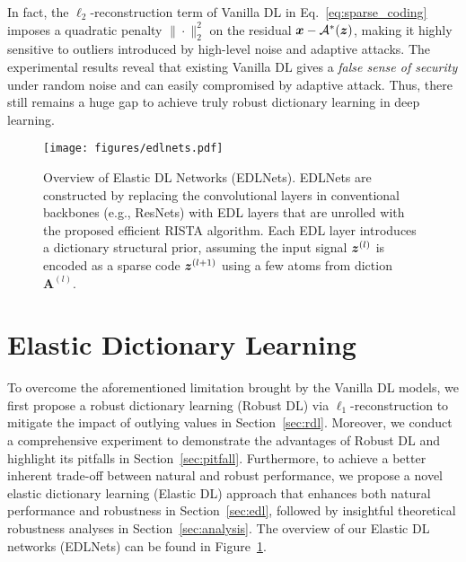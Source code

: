  
 
 

 In fact, the $\ell_2$-reconstruction term of Vanilla DL in Eq.~\eqref{eq:sparse_coding} imposes a quadratic penalty $\|\cdot\|_2^2$ on the residual ${\bm{x}}-{\mathcal{A}}^*({\bm{z}})$, making it highly sensitive to outliers introduced by high-level noise and adaptive attacks.
 The experimental results reveal that existing Vanilla DL gives a \textit{false sense of security} under random noise and can easily compromised by adaptive attack. Thus, there still remains a huge gap to achieve truly robust dictionary learning in deep learning.




\begin{figure*}[h!]
    \centering
    \texttt{[image: figures/edlnets.pdf]} 
    \caption{Overview of Elastic DL Networks (EDLNets). EDLNets are constructed by replacing the convolutional layers in conventional backbones 
    (e.g., ResNets)
    with EDL layers that are unrolled with the proposed efficient RISTA algorithm. Each EDL layer introduces a 
    dictionary structural prior, 
    assuming the input signal ${\bm{z}}^{(l)}$ is encoded as a sparse code ${\bm{z}}^{(l+1)}$ using a few atoms from diction $\mathbf{A}^{(l)}$.
  }
    \label{fig:overview_edlnets}
    \vspace{-0.1in}
\end{figure*}



\section{Elastic Dictionary Learning}
\label{sec:method}

To overcome the aforementioned limitation brought by the Vanilla DL models, we first propose a robust dictionary learning (Robust DL) via $\ell_1$-reconstruction to mitigate the impact of outlying values in Section~\ref{sec:rdl}. Moreover, we conduct a comprehensive experiment to demonstrate the advantages of Robust DL and highlight its pitfalls in Section~\ref{sec:pitfall}. Furthermore, to achieve a better inherent trade-off between natural and robust performance, we propose a novel elastic dictionary learning (Elastic DL) approach that enhances both  natural performance and robustness in Section~\ref{sec:edl}, followed by insightful theoretical robustness analyses in Section~\ref{sec:analysis}. The overview of our Elastic DL networks (EDLNets) can be found in Figure~\ref{fig:overview_edlnets}.




